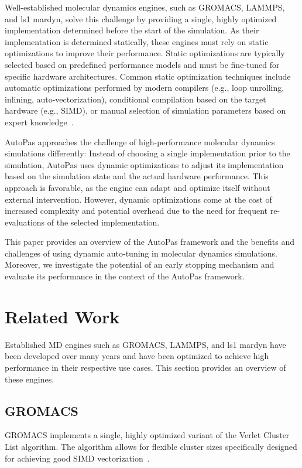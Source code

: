 \documentclass[conference]{IEEEtran}
\begin{document}
Well-established molecular dynamics engines, such as GROMACS, LAMMPS, and ls1 mardyn, solve this challenge by providing a single, highly optimized implementation determined before the start of the simulation. As their implementation is determined statically, these engines must rely on static optimizations to improve their performance. Static optimizations are typically selected based on predefined performance models and must be fine-tuned for specific hardware architectures. Common static optimization techniques include automatic optimizations performed by modern compilers (e.g., loop unrolling, inlining, auto-vectorization), conditional compilation based on the target hardware (e.g., SIMD), or manual selection of simulation parameters based on expert knowledge~\cite{Gratl2019AutoPas}.

AutoPas approaches the challenge of high-performance molecular dynamics simulations differently: Instead of choosing a single implementation prior to the simulation, AutoPas uses dynamic optimizations to adjust its implementation based on the simulation state and the actual hardware performance. This approach is favorable, as the engine can adapt and optimize itself without external intervention. However, dynamic optimizations come at the cost of increased complexity and potential overhead due to the need for frequent re-evaluations of the selected implementation.

This paper provides an overview of the AutoPas framework and the benefits and challenges of using dynamic auto-tuning in molecular dynamics simulations. Moreover, we investigate the potential of an early stopping mechanism and evaluate its performance in the context of the AutoPas framework.

\section{Related Work}

Established MD engines such as GROMACS, LAMMPS, and ls1 mardyn have been developed over many years and have been optimized to achieve high performance in their respective use cases. This section provides an overview of these engines.

\subsection{GROMACS}

GROMACS implements a single, highly optimized variant of the Verlet Cluster List algorithm. The algorithm allows for flexible cluster sizes specifically designed for achieving good SIMD vectorization~\cite{PALL20132641}.
\end{document}
